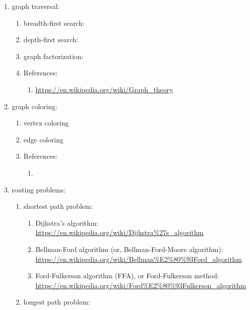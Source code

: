 \begin{enumerate} \itemsep -4pt
\item graph traversal: \vspace{-0.3cm}
	\begin{enumerate} \itemsep -2pt
	\item breadth-first search: \url{}
	\item depth-first search: \url{}
	\item graph factorization: \url{}
	\item References: \vspace{-0.2cm}
		\begin{enumerate} \itemsep -2pt
		\item \url{https://en.wikipedia.org/wiki/Graph_theory}
		\end{enumerate}
	\end{enumerate}
\item graph coloring: \vspace{-0.3cm}
	\begin{enumerate} \itemsep -2pt
	\item vertex coloring
	\item edge coloring
	\item References: \vspace{-0.2cm}
		\begin{enumerate} \itemsep -2pt
		\item 
		\end{enumerate}
	\end{enumerate}
\item routing problems: \vspace{-0.3cm}
	\begin{enumerate} \itemsep -2pt
	\item shortest path problem: \vspace{-0.2cm}
		\begin{enumerate} \itemsep -2pt
		\item Dijkstra's algorithm: \url{https://en.wikipedia.org/wiki/Dijkstra%27s_algorithm}
		\item Bellman-Ford algorithm (or, Bellman-Ford-Moore algorithm): \url{https://en.wikipedia.org/wiki/Bellman%E2%80%93Ford_algorithm}
		\item Ford-Fulkerson algorithm (FFA), or Ford-Fulkerson method: \url{https://en.wikipedia.org/wiki/Ford%E2%80%93Fulkerson_algorithm}
		\end{enumerate}
	\item longest path problem: \vspace{-0.2cm}

\end{enumerate}
\end{enumerate}
